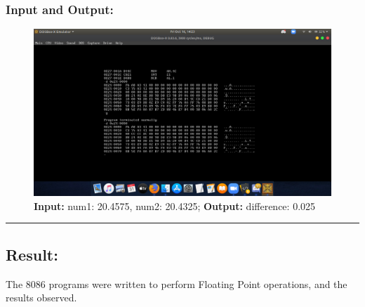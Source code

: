 \documentclass[10pt,a4paper]{article}
\begin{document}
\begin{flushleft}
\subsubsection*{\textbf{Input and Output:}}
\begin{figure}[h]
    \centering
    \includegraphics[trim = 100mm 60mm 100mm 80mm, clip, width = \textwidth]{Pics/FSIO.png}
    \caption{ \textbf{Input:} num1: 20.4575, num2: 20.4325; \newline \hspace{1cm}
              \textbf{Output:} difference: 0.025}
\end{figure}
\hrule
\subsection*{\textbf{Result:}}
The 8086 programs were written to perform Floating Point operations, and the results observed.
\end{flushleft}
\end{document}
